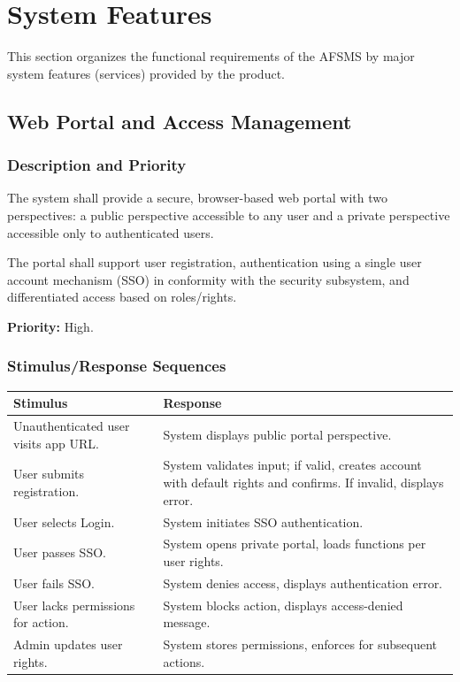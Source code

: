\documentclass[11pt, a4paper]{article}
\begin{document}
\section{System Features}
This section organizes the functional requirements of the AFSMS by major system features (services) provided by the product.

\subsection{Web Portal and Access Management}
\subsubsection{Description and Priority}
The system shall provide a secure, browser-based web portal with two perspectives: a public perspective accessible to any user and a private perspective accessible only to authenticated users.

The portal shall support user registration, authentication using a single user account mechanism (SSO) in conformity with the security subsystem, and differentiated access based on roles/rights.

\textbf{Priority:} High.

\subsubsection{Stimulus/Response Sequences}
\begin{table}[H]
\begin{tabularx}{\textwidth}{>{\raggedright\arraybackslash}p{3.2cm} >{\raggedright\arraybackslash}X}
\toprule
\textbf{Stimulus} & \textbf{Response} \\
\midrule
Unauthenticated user visits app URL. & System displays public portal perspective. \\
\midrule
User submits registration. & System validates input; if valid, creates account with default rights and confirms. If invalid, displays error. \\
\midrule
User selects Login. & System initiates SSO authentication. \\
\midrule
User passes SSO. & System opens private portal, loads functions per user rights. \\
\midrule
User fails SSO. & System denies access, displays authentication error. \\
\midrule
User lacks permissions for action. & System blocks action, displays access-denied message. \\
\midrule
Admin updates user rights. & System stores permissions, enforces for subsequent actions. \\
\bottomrule
\end{tabularx}
\end{table}
\end{document}
